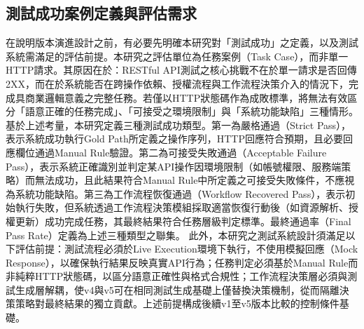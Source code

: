 \begin{ZhChapter}
\clearpage
\subsection{測試成功案例定義與評估需求}
\text 在說明版本演進設計之前，有必要先明確本研究對「測試成功」之定義，以及測試系統需滿足的評估前提。本研究之評估單位為任務案例（Task Case），而非單一HTTP請求。其原因在於：RESTful API測試之核心挑戰不在於單一請求是否回傳2XX，而在於系統能否在跨操作依賴、授權流程與工作流程決策介入的情況下，完成具商業邏輯意義之完整任務。若僅以HTTP狀態碼作為成敗標準，將無法有效區分「語意正確的任務完成」、「可接受之環境限制」與「系統功能缺陷」三種情形。
\text 基於上述考量，本研究定義三種測試成功類型。第一為嚴格通過（Strict Pass），表示系統成功執行Gold Path所定義之操作序列，HTTP回應符合預期，且必要回應欄位通過Manual Rule驗證。第二為可接受失敗通過（Acceptable Failure Pass），表示系統正確識別並判定某API操作因環境限制（如帳號權限、服務端策略）而無法成功，且此結果符合Manual Rule中所定義之可接受失敗條件，不應視為系統功能缺陷。第三為工作流程恢復通過（Workflow Recovered Pass），表示初始執行失敗，但系統透過工作流程決策模組採取適當恢復行動後（如資源解析、授權更新）成功完成任務，其最終結果符合任務層級判定標準。最終通過率（Final Pass Rate）定義為上述三種類型之聯集。
\text 此外，本研究之測試系統設計須滿足以下評估前提：測試流程必須於Live Execution環境下執行，不使用模擬回應（Mock Response），以確保執行結果反映真實API行為；任務判定必須基於Manual Rule而非純粹HTTP狀態碼，以區分語意正確性與格式合規性；工作流程決策層必須與測試生成層解耦，使v4與v5可在相同測試生成基礎上僅替換決策機制，從而隔離決策策略對最終結果的獨立貢獻。上述前提構成後續v1至v5版本比較的控制條件基礎。


\end{ZhChapter}

